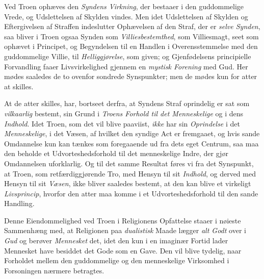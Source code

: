 Ved Troen ophæves den \emph{Syndens Virkning}, der
 bestaaer i den guddommelige Vrede, og Udslettelsen af Skylden vindes. Men idet
Udslettelsen af Skylden og Eftergivelsen af Straffen indeslutter Ophævelsen af
den Straf, der er \emph{selve Synden}, saa bliver i Troen ogsaa Synden som
\emph{Villiesbestemthed}, som Villiesmagt, seet som ophævet i Principet, og
Begyndelsen til en Handlen i Overensstemmelse med den guddommelige Villie, til
\emph{Helliggjørelse}, som given; og Gjenfødelsens principielle Forvandling
faaer Livsvirkelighed gjennem en \emph{mystisk Forening} med Gud. Her mødes
saaledes de to ovenfor sondrede Synspunkter; men de mødes kun for atter at
skilles.

At de atter skilles, har, bortseet derfra, at Syndens Straf oprindelig er sat
som \emph{vilkaarlig} bestemt, sin Grund i \emph{Troens Forhold til det
Menneskelige} og i dens \emph{Indhold}. Idet Troen, som det vil blive paaviist,
\emph{ikke} har sin \emph{Oprindelse} i det \emph{Menneskelige}, i det Væsen, af
hvilket den syndige Act er fremgaaet, og hvis sande Omdannelse kun kan tænkes
som foregaaende ud fra dets eget Centrum, saa maa den beholde et
Udvorteshedsforhold til det menneskelige Indre, der gjør Omdannelsen
uforklarlig. Og til det samme Resultat føres vi fra det Synspunkt, at Troen, som
retfærdiggjørende Tro, med Hensyn til sit \emph{Indhold}, og derved med Hensyn
til sit \emph{Væsen}, ikke bliver saaledes bestemt, at den kan blive et
virkeligt \emph{Livsprincip}, hvorfor den atter maa komme i et
Udvorteshedsforhold til den sande Handling.

Denne Eiendommelighed ved Troen i Religionens Opfattelse staaer i nøieste
Sammenhæng med, at Religionen paa \emph{dualistisk} Maade lægger \emph{alt Godt}
over i \emph{Gud} og berøver \emph{Mennesket} det, idet den kun i en imaginær
Fortid lader Mennesket have besiddet det Gode som en Gave. Den vil blive
tydelig, naar Forholdet mellem den guddommelige og den menneskelige Virksomhed i
Forsoningen nærmere betragtes.

